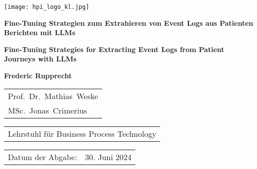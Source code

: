 \begin{titlepage}
	\begin{flushright}
		\texttt{[image: hpi\_logo\_kl.jpg]}
	\end{flushright}
	\begin{center}
		\hbox{}
		\vfill
		{\huge\bfseries Fine-Tuning Strategien zum Extrahieren von Event Logs aus Patienten Berichten mit LLMs \par}
		\vskip 0.5cm
		{\huge\bfseries Fine-Tuning Strategies for Extracting Event Logs from Patient Journeys with LLMs \par}
		\vskip 1.5cm
		\textbf{Frederic Rupprecht}\\
		\vskip 1.5cm
		\begin{tabular}{l}
			Prof.~Dr.~Mathias~Weske \\
			MSc.~Jonas~Crimerius \\
		\end{tabular}
		\vskip 0.25cm
		\begin{tabular}{l}
			Lehrstuhl für Business Process Technology
		\end{tabular}
		\vskip 1.5cm
		\begin{tabular}{ll}
			Datum der Abgabe: & 30. Juni 2024 \\
		\end{tabular}
	\end{center}	
	\vfill
\end{titlepage}


